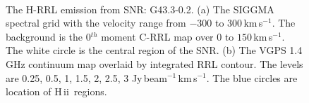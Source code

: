 \documentclass[manuscript]{aastex61}
\newcommand{\hii}{{\rm H\,}{{\sc ii}}}
\newcommand{\kms}{\,km\,s$^{-1}$}
\begin{document}
\begin{figure}[H]
\centering
{}
\\
\caption{The H-RRL emission from SNR: G43.3-0.2.
          (a) The SIGGMA spectral grid with the velocity range from $-300$ to $300$\kms.
	  The background is the 0$^{th}$ moment C-RRL map over $0$ to $150$\kms.
	  The white circle is the central region of the SNR.
	  (b) The VGPS 1.4 GHz continuum map overlaid by integrated RRL contour.
	  The levels are 0.25, 0.5, 1, 1.5, 2, 2.5, 3 Jy\,beam$^{-1}$\kms.
	  The blue circles are location of \hii\ regions.
	  }
\label{fig_snr-g433}
\end{figure}
\end{document}
